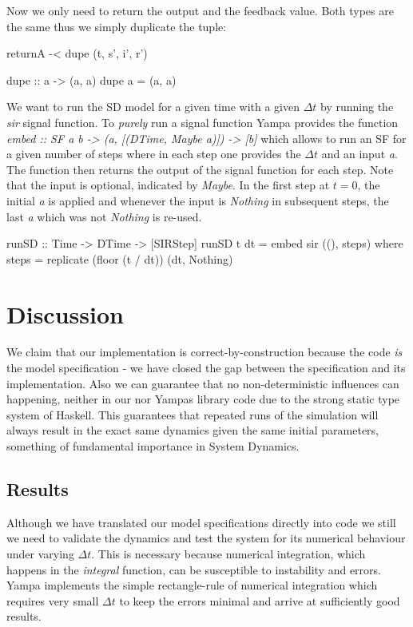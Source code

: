 Now we only need to return the output and the feedback value. Both types are the same thus we simply duplicate the tuple:

\begin{HaskellCode}
      returnA -< dupe (t, s', i', r')

    dupe :: a -> (a, a)
    dupe a = (a, a)
\end{HaskellCode}

We want to run the SD model for a given time with a given $\Delta t$ by running the \textit{sir} signal function. To \textit{purely} run a signal function Yampa provides the function \textit{embed :: SF a b -> (a, [(DTime, Maybe a)]) -> [b]} which allows to run an SF for a given number of steps where in each step one provides the $\Delta t$ and an input \textit{a}. The function then returns the output of the signal function for each step. Note that the input is optional, indicated by \textit{Maybe}. In the first step at $t = 0$, the initial \textit{a} is applied and whenever the input is \textit{Nothing} in subsequent steps, the last \textit{a} which was not \textit{Nothing} is re-used.

\begin{HaskellCode}
runSD :: Time -> DTime -> [SIRStep]
runSD t dt = embed sir ((), steps)
  where
    steps = replicate (floor (t / dt)) (dt, Nothing)
\end{HaskellCode}

\section{Discussion}
We claim that our implementation is correct-by-construction because the code \textit{is} the model specification - we have closed the gap between the specification and its implementation. Also we can guarantee that no non-deterministic influences can happening, neither in our nor Yampas library code due to the strong static type system of Haskell. This guarantees that repeated runs of the simulation will always result in the exact same dynamics given the same initial parameters, something of fundamental importance in System Dynamics.

\subsection{Results}
Although we have translated our model specifications directly into code we still we need to validate the dynamics and test the system for its numerical behaviour under varying $\Delta t$. This is necessary because numerical integration, which happens in the \textit{integral} function, can be susceptible to instability and errors. Yampa implements the simple rectangle-rule of numerical integration which requires very small $\Delta t$ to keep the errors minimal and arrive at sufficiently good results. 

